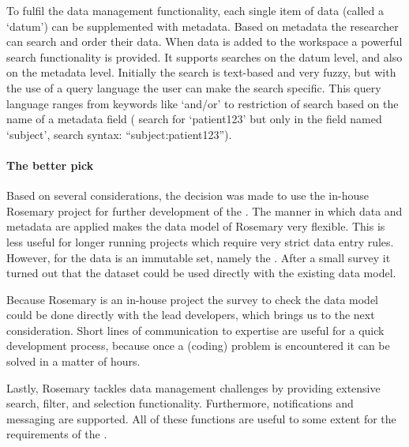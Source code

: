 To fulfil the data management functionality, each single item of data (called a `datum') can be supplemented with metadata.
Based on metadata the researcher can search and order their data.
When data is added to the workspace a powerful search functionality is provided.
It supports searches on the datum level, and also on the metadata level.
Initially the search is text-based and very fuzzy, but with the use of a query language the user can make the search specific.
This query language ranges from keywords like `and/or' to restriction of search based on the name of a metadata field (\eg{} search for `patient123' but only in the field named `subject', search syntax: ``subject:patient123'').

\paragraph{The better pick}
Based on several considerations, the decision was made to use the in-house Rosemary project for further development of the \ivfsystem{}.
The manner in which data and metadata are applied makes  the data model of Rosemary very flexible.
This is less useful for longer running projects which require very strict data entry rules.
However, for the \ivfsystem{} data is an immutable set, namely the \projectdata{}.
After a small survey it turned out that the dataset could be used directly with the existing data model.

Because Rosemary is an in-house project the survey to check the data model could be done directly with the lead developers, which brings us to the next consideration.
Short lines of communication to expertise are useful for a quick development process, because once a (coding) problem is encountered it can be solved in a matter of hours.

Lastly, Rosemary tackles data management challenges by providing extensive search, filter, and selection functionality.
Furthermore, notifications and messaging are supported.
All of these functions are useful to some extent for the requirements of the \ivfsystem{}.